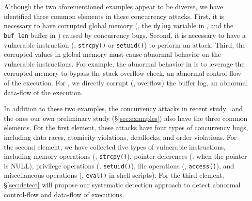 Although the two aforementioned examples appear to be diverse, we have 
identified three common elements in these concurrency attacks. First, it is 
necessary to have corrupted global memory (\eg, the \texttt{dying} variable in 
\libsafe, and the \texttt{buf\_len} buffer in \apache) caused by concurrency 
bugs. Second, it is necessary to have a vulnerable instruction (\eg, 
\texttt{strcpy()} or 
\texttt{setuid()}) to perform an attack. Third, the corrupted values in global 
memory must cause abnormal behavior on the vulnerable instructions. For 
example, the abnormal behavior in \libsafe is to leverage the corrupted 
memory to bypass the stack overflow check, an abnormal control-flow of the 
execution. For \apache, we directly corrupt (\ie, overflow) the buffer 
log, an abnormal data-flow of the execution.

% 
In addition to these two examples, the \noldattacks concurrency 
attacks in recent study~\cite{con:hotpar12} and the \nattacks ones our own 
preliminary study (\S\ref{sec:examples}) also have the three common elements. 
For the first element, these attacks have four types of concurrency bugs, 
including data races, atomicity violations, deadlocks, and order violations. 
For the second element, we have collected five types of vulnerable 
instructions, including memory operations (\eg, \texttt{strcpy()}), pointer 
deferences (\eg, when the pointer is NULL), privilege operations (\eg, 
\texttt{setuid()}), file operations (\eg, \texttt{access()}), and miscellaneous 
operations (\eg, \texttt{eval()} in shell scripts). For the third element, 
\S\ref{sec:detect} will propose our systematic detection approach to detect 
abnormal control-flow and data-flow of executions.


